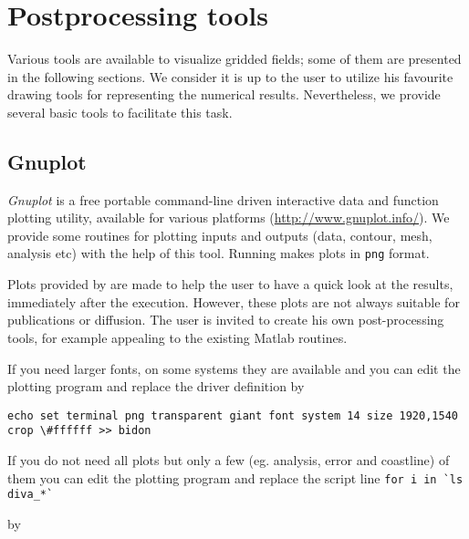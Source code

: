 \chapter{Postprocessing tools\label{chap:postprocessing}}

Various tools are available to visualize gridded fields; some of them are presented in the following sections. We consider it is up to the user to utilize his favourite drawing tools for representing the numerical results. Nevertheless, we provide several basic tools to facilitate this task.


\minitoc

\section{Gnuplot\label{sec:visugnuplot}}

\textsl{Gnuplot} is a free portable command-line driven interactive data and function plotting utility, available for various platforms (\url{http://www.gnuplot.info/}). We provide some routines for plotting \diva inputs and outputs (data, contour, mesh, analysis etc) with the help of this tool. Running  makes plots in \texttt{png} format. 

\begin{tips}
Plots provided by \gnuplot are made to help the user to have a quick look at the results, immediately after the execution. However, these plots are not always suitable for publications or diffusion. The user is invited to create his own post-processing tools, for example appealing to the existing Matlab routines.
\end{tips}

\begin{tips}
If you need larger fonts, on some systems they are available and you can edit the plotting program 
and replace the driver definition by
\begin{tiny}
\begin{verbatim}
echo set terminal png transparent giant font system 14 size 1920,1540 crop \#ffffff >> bidon
\end{verbatim}
\end{tiny}
\end{tips}

\begin{tips}
If you do not need all plots but only a few (eg. analysis, error and coastline) of them you can edit the plotting program  and replace the script line \verb#for i in `ls diva_*`# 

by
\end{tips}


